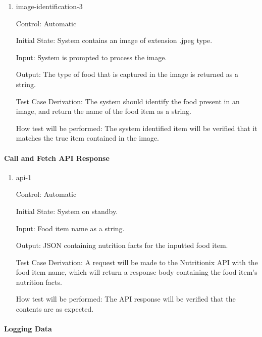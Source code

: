 \documentclass[12pt, titlepage]{article}
\begin{document}
\begin{enumerate}
		\item{image-identification-3\\}
		
		Control: Automatic
		
		Initial State: System contains an image of extension .jpeg type.
		
		Input: System is prompted to process the image.
		
		Output: The type of food that is captured in the image is returned as a 
		string.
		
		Test Case Derivation: The system should identify the food present in an 
		image, and return the name of the food item as a string.
		
		How test will be performed: The system identified item will be verified 
		that it matches the true item contained in the image.
		
	\end{enumerate}
	
	\paragraph{Call and Fetch API Response}
	
	\begin{enumerate}
		
		\item{api-1\\}
		
		Control: Automatic
		
		Initial State: System on standby.
		
		Input: Food item name as a string.
		
		Output: JSON containing nutrition facts for the inputted food item.
		
		Test Case Derivation: A request will be made to the Nutritionix API 
		with the food item name, which will return a response body containing 
		the food item's nutrition facts.
		
		How test will be performed: The API response will be verified that the 
		contents are as expected.
		
	\end{enumerate}
	
	\paragraph{Logging Data}
	
\end{document}
